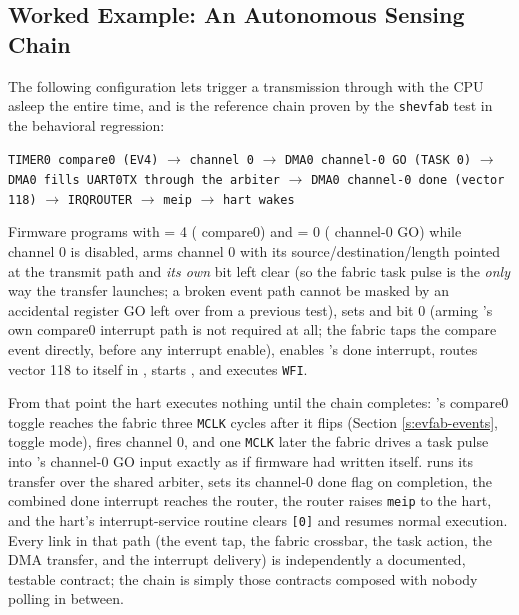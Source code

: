 \subsection{Worked Example: An Autonomous Sensing Chain}
\label{s:evfab-example}

The following configuration lets  trigger a  transmission through  with the CPU asleep the entire time, and is the reference chain proven by the \texttt{shevfab} test in the behavioral regression:

\begin{center}
\texttt{TIMER0 compare0 (EV4)} $\rightarrow$ \texttt{channel 0} $\rightarrow$ \texttt{DMA0 channel-0 GO (TASK 0)} $\rightarrow$ \texttt{DMA0 fills UART0TX through the arbiter} $\rightarrow$ \texttt{DMA0 channel-0 done (vector 118)} $\rightarrow$ \texttt{IRQROUTER} $\rightarrow$ \texttt{meip} $\rightarrow$ \texttt{hart wakes}
\end{center}

Firmware programs  with  = 4 ( compare0) and  = 0 ( channel-0 GO) while channel 0 is disabled, arms  channel 0 with its source/destination/length pointed at the  transmit path and \textit{its own}  bit left clear (so the fabric task pulse is the \textit{only} way the transfer launches; a broken event path cannot be masked by an accidental register GO left over from a previous test), sets  and  bit 0 (arming 's own compare0 interrupt path is not required at all; the fabric taps the compare event directly, before any interrupt enable), enables 's done interrupt, routes vector 118 to itself in , starts , and executes \texttt{WFI}.

From that point the hart executes nothing until the chain completes: 's compare0 toggle reaches the fabric three \texttt{MCLK} cycles after it flips (Section \ref{s:evfab-events}, toggle mode), fires channel 0, and one \texttt{MCLK} later the fabric drives a task pulse into 's channel-0 GO input exactly as if firmware had written  itself.  runs its transfer over the shared arbiter, sets its channel-0 done flag on completion, the combined done interrupt reaches the router, the router raises \texttt{meip} to the hart, and the hart's interrupt-service routine clears \texttt{[0]} and resumes normal execution. Every link in that path (the event tap, the fabric crossbar, the task action, the DMA transfer, and the interrupt delivery) is independently a documented, testable contract; the chain is simply those contracts composed with nobody polling in between.

